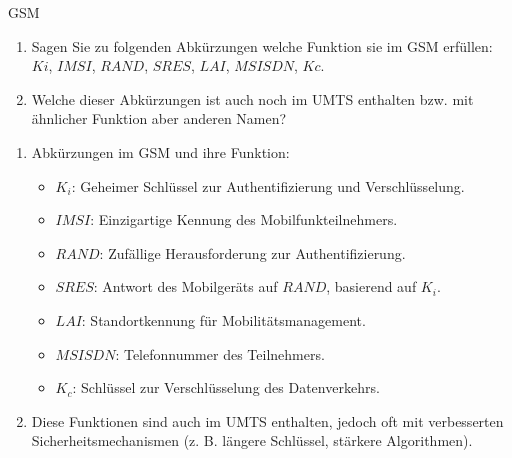 \documentclass{article}
\begin{document}
\begin{exercise}{GSM}
  \begin{enumerate}
    \item Sagen Sie zu folgenden Abkürzungen welche Funktion sie im GSM erfüllen: $Ki$, $IMSI$, $RAND$, $SRES$, $LAI$, $MSISDN$, $Kc$.
    \item Welche dieser Abkürzungen ist auch noch im UMTS enthalten bzw. mit ähnlicher Funktion aber anderen Namen?
  \end{enumerate}

  \begin{solution}
    \begin{enumerate}
        \item Abkürzungen im GSM und ihre Funktion:
        \begin{itemize}
            \item $ K_i $: Geheimer Schlüssel zur Authentifizierung und Verschlüsselung.
            \item $ IMSI $: Einzigartige Kennung des Mobilfunkteilnehmers.
            \item $ RAND $: Zufällige Herausforderung zur Authentifizierung.
            \item $ SRES $: Antwort des Mobilgeräts auf $ RAND $, basierend auf $ K_i $.
            \item $ LAI $: Standortkennung für Mobilitätsmanagement.
            \item $ MSISDN $: Telefonnummer des Teilnehmers.
            \item $ K_c $: Schlüssel zur Verschlüsselung des Datenverkehrs.
        \end{itemize}
        \item Diese Funktionen sind auch im UMTS enthalten, jedoch oft mit verbesserten Sicherheitsmechanismen (z. B. längere Schlüssel, stärkere Algorithmen).
    \end{enumerate}
  \end{solution}
\end{exercise}
\end{document}
